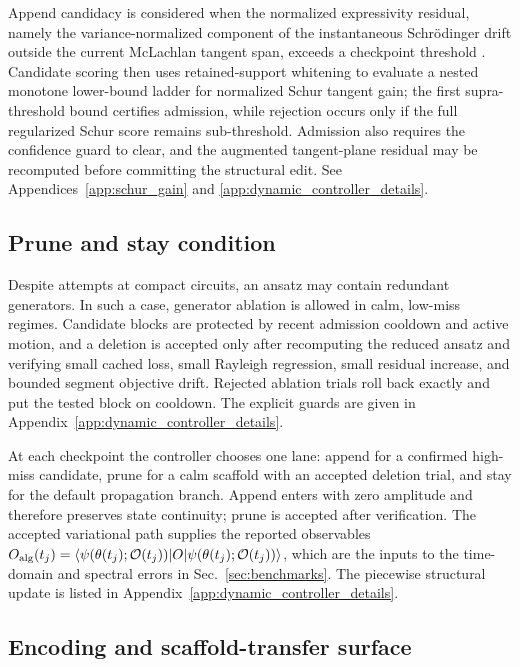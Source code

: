 \documentclass[
  reprint,
  amsmath,
  amssymb,
  aps,
  pra,
  nofootinbib,
  superscriptaddress,
  floatfix
]{revtex4-2}
\newcommand{\placeholder}[1]{\textcolor{red!70!black}{\ifmmode\left[#1\right]\else\textsf{[#1]}\fi}}
\newcommand{\Oset}{\mathcal{O}}
\newcommand{\ket}[1]{|#1\rangle}
\newcommand{\bra}[1]{\langle #1|}
\begin{document}
Append candidacy is considered when the normalized expressivity residual, namely the variance-normalized component of the instantaneous Schrödinger drift outside the current McLachlan tangent span, exceeds a checkpoint threshold \cite{Yao2021,Linteau2024,Zhang2025}. %
Candidate scoring then uses retained-support whitening to evaluate a nested monotone lower-bound ladder for normalized Schur tangent gain; the first supra-threshold bound certifies admission, while rejection occurs only if the full regularized Schur score remains sub-threshold. Admission also requires the confidence guard to clear, and the augmented tangent-plane residual may be recomputed before committing the structural edit. See Appendices~\ref{app:schur_gain} and \ref{app:dynamic_controller_details}.

\subsection{Prune and stay condition}

Despite attempts at compact circuits, an ansatz may contain redundant generators. In such a case, generator ablation is allowed in calm, low-miss regimes. Candidate blocks are protected by recent admission cooldown and active motion, and a deletion is accepted only after recomputing the reduced ansatz and verifying small cached loss, small Rayleigh regression, small residual increase, and bounded segment objective drift. Rejected ablation trials roll back exactly and put the tested block on cooldown. The explicit guards are given in Appendix~\ref{app:dynamic_controller_details}.

At each checkpoint the controller chooses one lane: append for a confirmed high-miss candidate, prune for a calm scaffold with an accepted deletion trial, and stay for the default propagation branch. Append enters with zero amplitude and therefore preserves state continuity; prune is accepted after verification. The accepted variational path supplies the reported observables $O_{\rm alg}(t_j)=\bra{\psi(\theta(t_j);\Oset(t_j))}O\ket{\psi(\theta(t_j);\Oset(t_j))}$, which are the inputs to the time-domain and spectral errors in Sec.~\ref{sec:benchmarks}. The piecewise structural update is listed in Appendix~\ref{app:dynamic_controller_details}.


\subsection{Encoding and scaffold-transfer surface}
\label{sec:dyn_encoding_surface}
\end{document}
